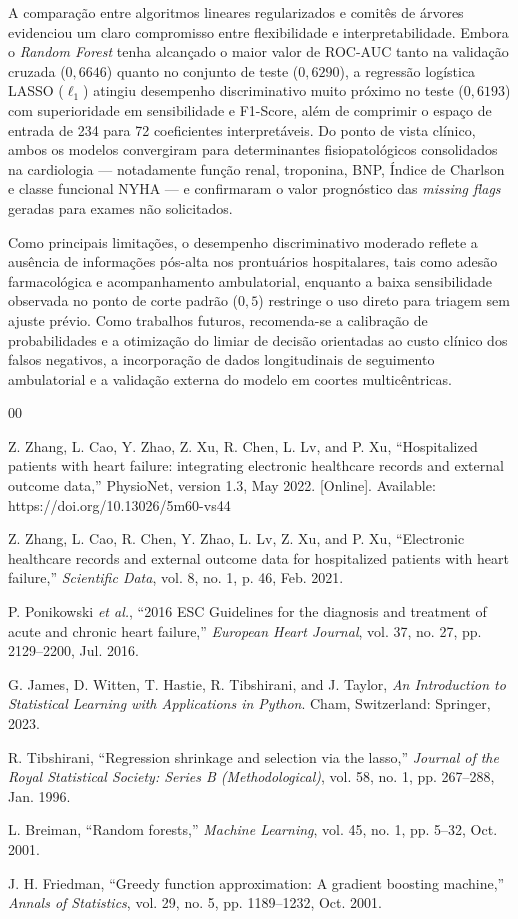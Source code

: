 \documentclass[conference]{IEEEtran}
\begin{document}
A comparação entre algoritmos lineares regularizados e comitês de árvores evidenciou um claro compromisso entre flexibilidade e interpretabilidade. Embora o \textit{Random Forest} tenha alcançado o maior valor de ROC-AUC tanto na validação cruzada ($0,6646$) quanto no conjunto de teste ($0,6290$), a regressão logística LASSO ($\ell_1$) atingiu desempenho discriminativo muito próximo no teste ($0,6193$) com superioridade em sensibilidade e F1-Score, além de comprimir o espaço de entrada de 234 para 72 coeficientes interpretáveis. Do ponto de vista clínico, ambos os modelos convergiram para determinantes fisiopatológicos consolidados na cardiologia --- notadamente função renal, troponina, BNP, Índice de Charlson e classe funcional NYHA --- e confirmaram o valor prognóstico das \textit{missing flags} geradas para exames não solicitados.

Como principais limitações, o desempenho discriminativo moderado reflete a ausência de informações pós-alta nos prontuários hospitalares, tais como adesão farmacológica e acompanhamento ambulatorial, enquanto a baixa sensibilidade observada no ponto de corte padrão ($0,5$) restringe o uso direto para triagem sem ajuste prévio. Como trabalhos futuros, recomenda-se a calibração de probabilidades e a otimização do limiar de decisão orientadas ao custo clínico dos falsos negativos, a incorporação de dados longitudinais de seguimento ambulatorial e a validação externa do modelo em coortes multicêntricas.

\begin{thebibliography}{00}

 Z. Zhang, L. Cao, Y. Zhao, Z. Xu, R. Chen, L. Lv, and P. Xu, ``Hospitalized patients with heart failure: integrating electronic healthcare records and external outcome data,'' PhysioNet, version 1.3, May 2022. [Online]. Available: https://doi.org/10.13026/5m60-vs44

 Z. Zhang, L. Cao, R. Chen, Y. Zhao, L. Lv, Z. Xu, and P. Xu, ``Electronic healthcare records and external outcome data for hospitalized patients with heart failure,'' \textit{Scientific Data}, vol. 8, no. 1, p. 46, Feb. 2021.

 P. Ponikowski \textit{et al.}, ``2016 ESC Guidelines for the diagnosis and treatment of acute and chronic heart failure,'' \textit{European Heart Journal}, vol. 37, no. 27, pp. 2129--2200, Jul. 2016.

 G. James, D. Witten, T. Hastie, R. Tibshirani, and J. Taylor, \textit{An Introduction to Statistical Learning with Applications in Python}. Cham, Switzerland: Springer, 2023.

 R. Tibshirani, ``Regression shrinkage and selection via the lasso,'' \textit{Journal of the Royal Statistical Society: Series B (Methodological)}, vol. 58, no. 1, pp. 267--288, Jan. 1996.

 L. Breiman, ``Random forests,'' \textit{Machine Learning}, vol. 45, no. 1, pp. 5--32, Oct. 2001.

 J. H. Friedman, ``Greedy function approximation: A gradient boosting machine,'' \textit{Annals of Statistics}, vol. 29, no. 5, pp. 1189--1232, Oct. 2001.

\end{thebibliography}
\end{document}
